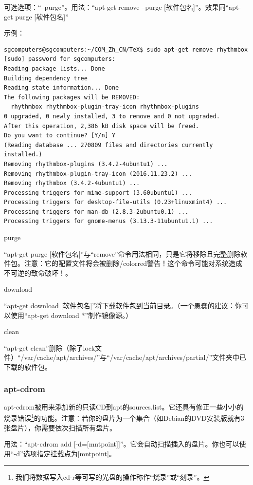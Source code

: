 \documentclass{book}
\begin{document}
可选选项：“--purge”。用法：“apt-get remove --purge [软件包名]”。效果同“apt-get purge [软件包名]”\par
示例：
\begin{verbatim}
sgcomputers@sgcomputers:~/COM_Zh_CN/TeX$ sudo apt-get remove rhythmbox
[sudo] password for sgcomputers: 
Reading package lists... Done
Building dependency tree       
Reading state information... Done
The following packages will be REMOVED:
  rhythmbox rhythmbox-plugin-tray-icon rhythmbox-plugins
0 upgraded, 0 newly installed, 3 to remove and 0 not upgraded.
After this operation, 2,386 kB disk space will be freed.
Do you want to continue? [Y/n] Y
(Reading database ... 270809 files and directories currently installed.)
Removing rhythmbox-plugins (3.4.2-4ubuntu1) ...
Removing rhythmbox-plugin-tray-icon (2016.11.23.2) ...
Removing rhythmbox (3.4.2-4ubuntu1) ...
Processing triggers for mime-support (3.60ubuntu1) ...
Processing triggers for desktop-file-utils (0.23+linuxmint4) ...
Processing triggers for man-db (2.8.3-2ubuntu0.1) ...
Processing triggers for gnome-menus (3.13.3-11ubuntu1.1) ...
\end{verbatim}
\begin{center} purge \end{center}
“apt-get purge [软件包名]”与“remove”命令用法相同，只是它将移除且完整删除软件包。注意：它的配置文件将会被删除{/color{red}{警告！这个命令可能对系统造成不可逆的致命破坏！}}。\par
\begin{center} download \end{center}
“apt-get download [软件包名]”将下载软件包到当前目录。（一个愚蠢的建议：你可以使用“apt-get download *”制作镜像源。{\color{red}{不要这么做。}}）
\begin{center} clean \end{center}
“apt-get clean”删除（除了lock文件）“/var/cache/apt/archives/”与“/var/cache/apt/archives/partial/”文件夹中已下载的软件包。
\subsubsection{apt-cdrom}
\cite{manaptcd}\par
apt-cdrom被用来添加新的只读CD到apt的sources.list。它还具有修正一些小小的烧录错误\footnote{我们将数据写入cd-r等可写的光盘的操作称作“烧录”或“刻录”。}的功能。注意：若你的盘片为一个集合（如Debian的DVD安装版就有3张盘片），你需要依次扫描所有盘片。\par
用法：“apt-cdrom add [-d=[mntpoint]]”。它会自动扫描插入的盘片。你也可以使用“-d”选项指定挂载点为[mntpoint]。\par
\end{document}
